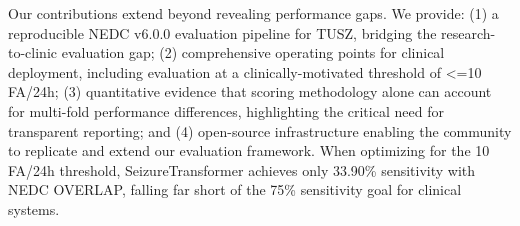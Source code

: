 \documentclass[10pt]{article}
\begin{document}
Our contributions extend beyond revealing performance gaps. We provide: (1) a reproducible NEDC v6.0.0 evaluation pipeline for TUSZ, bridging the research-to-clinic evaluation gap; (2) comprehensive operating points for clinical deployment, including evaluation at a clinically-motivated threshold of <=10 FA/24h; (3) quantitative evidence that scoring methodology alone can account for multi-fold performance differences, highlighting the critical need for transparent reporting; and (4) open-source infrastructure enabling the community to replicate and extend our evaluation framework. When optimizing for the 10 FA/24h threshold, SeizureTransformer achieves only 33.90\% sensitivity with NEDC OVERLAP, falling far short of the 75\% sensitivity goal for clinical systems.
\end{document}
